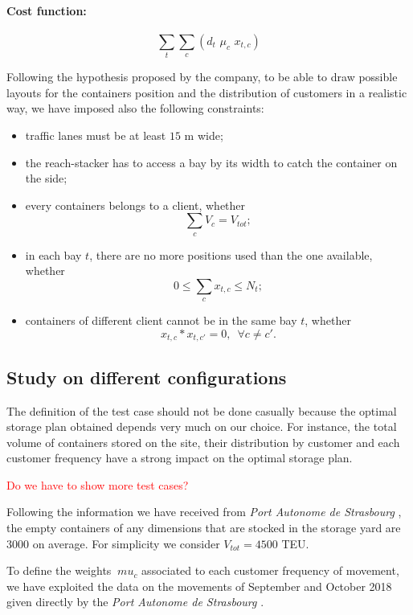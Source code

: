 \documentclass{article}
\newcommand{\ls}[1]{\textcolor{red}{#1}}
\newcommand{\PAS}{\emph{Port Autonome de Strasbourg }}
\begin{document}
\paragraph{Cost function:}

\begin{equation}
\displaystyle \sum_t \sum_c (d_t \,\, \mu_c \,\, x_{t,c})
\end{equation}



Following the hypothesis proposed by the company, to be able to draw possible layouts for the containers position and the distribution of customers in a realistic way, we have imposed also the following constraints:
\begin{itemize}
	\item traffic lanes must be at least $15$ m wide;
	\item the reach-stacker has to access a bay by its width to catch the container on the side;
	\item every containers belongs to a client, whether $$\sum_ {c} V_c = V_ {tot}; $$
	\item in each bay $ t $, there are no more positions used than the one available, whether $$0\le \sum_c x_{t,c} \le N_t;$$
	\item containers of different client cannot be in the same bay $t$, whether \linebreak $$x_{t,c}*x_{t,c'}=0, \,\,\, \forall c \neq c'.$$
\end{itemize}

\subsection{Study on different configurations} 

The definition of the test case should not be done casually because the optimal storage plan obtained depends very much on our choice. 
For instance, the total volume of containers stored on the site, their distribution by customer and each customer frequency have a strong impact on the optimal storage plan. 

\ls{Do we have to show more test cases?}

Following the information we have received from \PAS, the empty containers of any dimensions that are stocked in the storage yard are $3000$ on average.
For simplicity we consider $V_{tot}=4500$ TEU. 

To define the weights $ \ mu_c $ associated to each customer frequency of movement, we have exploited the data on the movements of September and October 2018 given directly by the \PAS.
 
\end{document}
